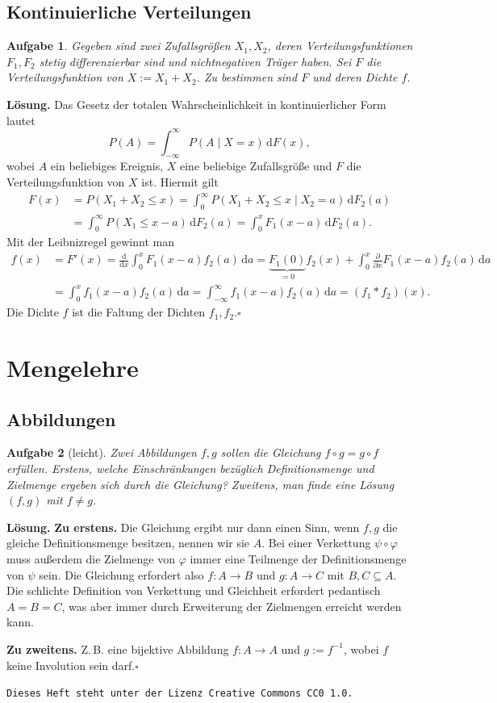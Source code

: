 \documentclass[a4paper,10pt,fleqn,twoside]{scrartcl}
\numberwithin{equation}{section}
\newcommand{\strong}[1]{{\normalfont\sffamily\bfseries #1}}
\renewcommand{\qedsymbol}{\ensuremath{\square}}
\theoremstyle{Aufgabe}
\newtheorem{Aufgabe}{\sffamily Aufgabe}[section]
\begin{document}
\newpage
\subsection{Kontinuierliche Verteilungen}
\begin{Aufgabe}
Gegeben sind zwei Zufallsgrößen $X_1,X_2$, deren Verteilungsfunktionen
$F_1,F_2$ stetig differenzierbar sind und nichtnegativen Träger haben.
Sei $F$ die Verteilungsfunktion von $X:=X_1+X_2$. Zu bestimmen sind
$F$ und deren Dichte $f$.
\end{Aufgabe}
\strong{Lösung.}
Das Gesetz der totalen Wahrscheinlichkeit in kontinuierlicher Form
lautet
\[P(A) = \int_{-\infty}^\infty P(A\mid X=x)\,\mathrm dF(x),\]
wobei $A$ ein beliebiges Ereignis, $X$ eine beliebige Zufallsgröße
und $F$ die Verteilungsfunktion von $X$ ist. Hiermit gilt
\begin{align*}
F(x) &= P(X_1+X_2\le x)
= \int_0^\infty P(X_1+X_2\le x\mid X_2=a)\,\mathrm dF_2(a)\\
&= \int_0^\infty P(X_1\le x-a)\,\mathrm dF_2(a)
= \int_0^x F_1(x-a)\,\mathrm dF_2(a).
\end{align*}
Mit der Leibnizregel gewinnt man
\begin{align*}
f(x) &= F'(x) = \frac{\mathrm d}{\mathrm dx}\int_0^x F_1(x-a)f_2(a)\,\mathrm da
= \underbrace{F_1(0)}_{=0}f_2(x) + \int_0^x \frac{\partial}{\partial x}F_1(x-a)f_2(a)\,\mathrm da\\
&= \int_0^x f_1(x-a)f_2(a)\,\mathrm da = \int_{-\infty}^\infty f_1(x-a)f_2(a)\,\mathrm da
= (f_1*f_2)(x).
\end{align*}
Die Dichte $f$ ist die Faltung der Dichten $f_1,f_2$.\;\qedsymbol

\section{Mengelehre}
\subsection{Abbildungen}

\begin{Aufgabe}[leicht]
Zwei Abbildungen $f,g$ sollen die Gleichung $f\circ g = g\circ f$
erfüllen. Erstens, welche Einschränkungen bezüglich Definitionsmenge
und Zielmenge ergeben sich durch die Gleichung? Zweitens, man finde
eine Lösung $(f,g)$ mit $f\ne g$.
\end{Aufgabe}
\strong{Lösung.} \strong{Zu erstens.}
Die Gleichung ergibt nur dann einen Sinn,
wenn $f,g$ die gleiche Definitionsmenge besitzen, nennen wir sie
$A$. Bei einer Verkettung $\psi\circ\varphi$ muss außerdem die
Zielmenge von $\varphi$ immer eine Teilmenge der Definitionsmenge
von $\psi$ sein. Die Gleichung erfordert also $f\colon A\to B$ und
$g\colon A\to C$ mit $B,C\subseteq A$. Die schlichte Definition
von Verkettung und Gleichheit erfordert pedantisch $A=B=C$,
was aber immer durch Erweiterung der Zielmengen erreicht werden
kann.

\strong{Zu zweitens.}
Z.\,B. eine bijektive Abbildung $f\colon A\to A$ und
$g:=f^{-1}$, wobei $f$ keine Involution sein darf.\;\qedsymbol

\vfill\noindent
\texttt{Dieses Heft steht unter der Lizenz Creative Commons CC0 1.0.}
\end{document}
